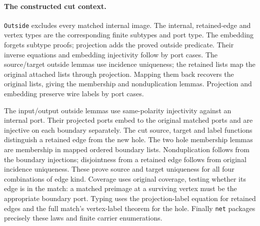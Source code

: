 \paragraph{The constructed cut context.}
\texttt{Outside} excludes every matched internal image. The internal,
retained-edge and vertex types are the corresponding finite subtypes and
port type. The embedding forgets subtype proofs; projection adds the proved
outside predicate. Their inverse equations and embedding injectivity follow
by port cases. The source/target outside lemmas use incidence uniqueness;
the retained lists map the original attached lists through projection.
Mapping them back recovers the original lists, giving the membership and
nonduplication lemmas. Projection and embedding preserve wire labels by
port cases.

The input/output outside lemmas use same-polarity injectivity against an
internal port. Their projected ports embed to the original matched ports
and are injective on each boundary separately. The cut source, target and
label functions distinguish a retained edge from the new hole. The two hole
membership lemmas are membership in mapped ordered boundary lists.
Nonduplication follows from the boundary injections; disjointness from a
retained edge follows from original incidence uniqueness. These prove
source and target uniqueness for all four combinations of edge kind.
Coverage uses original coverage, testing whether its edge is in the match:
a matched preimage at a surviving vertex must be the appropriate boundary
port. Typing uses the projection-label equation for retained edges and the
full match's vertex-label theorem for the hole. Finally \texttt{net}
packages precisely these laws and finite carrier enumerations.

